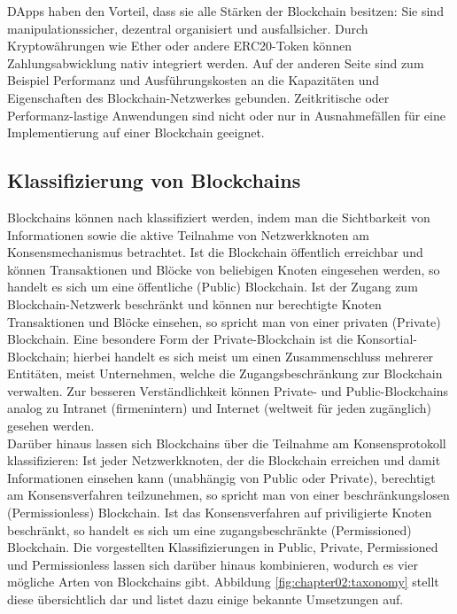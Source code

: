 \ac{DApp}s haben den Vorteil, dass sie alle Stärken der Blockchain besitzen: Sie sind manipulationssicher, dezentral organisiert und ausfallsicher. Durch Kryptowährungen wie Ether oder andere ERC20-Token können Zahlungsabwicklung nativ integriert werden. Auf der anderen Seite sind zum Beispiel Performanz und Ausführungskosten an die Kapazitäten und Eigenschaften des Blockchain-Netzwerkes gebunden. Zeitkritische oder Performanz-lastige Anwendungen sind nicht oder nur in Ausnahmefällen für eine Implementierung auf einer Blockchain geeignet.

\subsection{Klassifizierung von Blockchains}
\label{subsec:fundamentals:dlt:classification}
Blockchains können nach \cite{overview2017} klassifiziert werden, indem man die Sichtbarkeit von Informationen sowie die aktive Teilnahme von Netzwerkknoten am Konsensmechanismus betrachtet. Ist die Blockchain öffentlich erreichbar und können Transaktionen und Blöcke von beliebigen Knoten eingesehen werden, so handelt es sich um eine öffentliche (Public) Blockchain. Ist der Zugang zum Blockchain-Netzwerk beschränkt und können nur berechtigte Knoten Transaktionen und Blöcke einsehen, so spricht man von einer privaten (Private) Blockchain. Eine besondere Form der Private-Blockchain ist die Konsortial-Blockchain; hierbei handelt es sich meist um einen Zusammenschluss mehrerer Entitäten, meist Unternehmen, welche die Zugangsbeschränkung zur Blockchain verwalten. Zur besseren Verständlichkeit können Private- und Public-Blockchains analog zu Intranet (firmenintern) und Internet (weltweit für jeden zugänglich) gesehen werden.\\
Darüber hinaus lassen sich Blockchains über die Teilnahme am Konsensprotokoll klassifizieren: Ist jeder Netzwerkknoten, der die Blockchain erreichen und damit Informationen einsehen kann (unabhängig von Public oder Private), berechtigt am Konsensverfahren teilzunehmen, so spricht man von einer beschränkungslosen (Permissionless) Blockchain. Ist das Konsensverfahren auf priviligierte Knoten beschränkt, so handelt es sich um eine zugangsbeschränkte (Permissioned) Blockchain. Die vorgestellten Klassifizierungen in Public, Private, Permissioned und Permissionless lassen sich darüber hinaus kombinieren, wodurch es vier mögliche Arten von Blockchains gibt. Abbildung \ref{fig:chapter02:taxonomy} stellt diese übersichtlich dar und listet dazu einige bekannte Umsetzungen auf.

